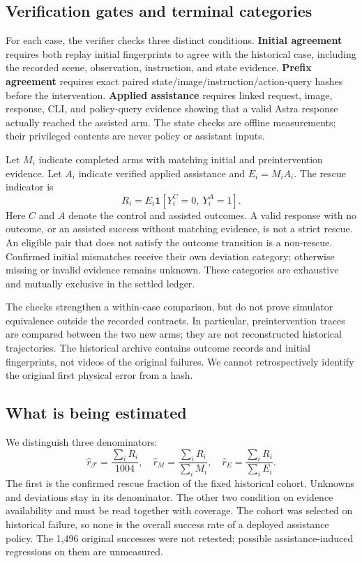 \documentclass[10pt,twocolumn,letterpaper]{article}
\newcommand{\F}{\mathcal F}
\newcommand{\ind}{\mathbf 1}
\begin{document}
\subsection{Verification gates and terminal categories}
\label{sec:gates}
For each case, the verifier checks three distinct conditions. \textbf{Initial agreement} requires both replay initial fingerprints to agree with the historical case, including the recorded scene, observation, instruction, and state evidence. \textbf{Prefix agreement} requires exact paired state/image/instruction/action-query hashes before the intervention. \textbf{Applied assistance} requires linked request, image, response, CLI, and policy-query evidence showing that a valid Astra response actually reached the assisted arm. The state checks are offline measurements; their privileged contents are never policy or assistant inputs.

Let $M_i$ indicate completed arms with matching initial and preintervention evidence. Let $A_i$ indicate verified applied assistance and $E_i=M_iA_i$. The rescue indicator is
\begin{equation}
R_i=E_i\ind[Y_i^{C}=0,\ Y_i^{A}=1].
\label{eq:rescue}
\end{equation}
Here $C$ and $A$ denote the control and assisted outcomes. A valid response with no outcome, or an assisted success without matching evidence, is not a strict rescue. An eligible pair that does not satisfy the outcome transition is a non-rescue. Confirmed initial mismatches receive their own deviation category; otherwise missing or invalid evidence remains unknown. These categories are exhaustive and mutually exclusive in the settled ledger.

The checks strengthen a within-case comparison, but do not prove simulator equivalence outside the recorded contracts. In particular, preintervention traces are compared between the two new arms; they are not reconstructed historical trajectories. The historical archive contains outcome records and initial fingerprints, not videos of the original failures. We cannot retrospectively identify the original first physical error from a hash.

\subsection{What is being estimated}
We distinguish three denominators:
\begin{equation}
\widehat r_{\F}=\frac{\sum_i R_i}{1004},\quad
\widehat r_M=\frac{\sum_i R_i}{\sum_i M_i},\quad
\widehat r_E=\frac{\sum_i R_i}{\sum_i E_i}.
\label{eq:rates}
\end{equation}
The first is the confirmed rescue fraction of the fixed historical cohort. Unknowns and deviations stay in its denominator. The other two condition on evidence availability and must be read together with coverage. The cohort was selected on historical failure, so none is the overall success rate of a deployed assistance policy. The 1,496 original successes were not retested; possible assistance-induced regressions on them are unmeasured.
\end{document}
